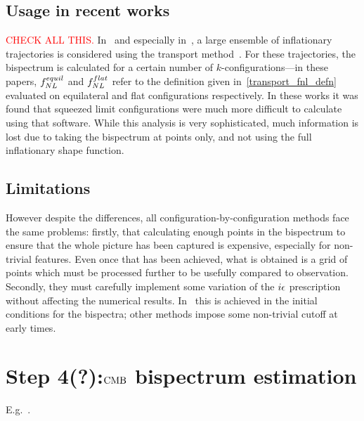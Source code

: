     \subsection{Usage in recent works}
    \textcolor{red}{CHECK ALL THIS.}
    In~\cite{RP_1, Fumagalli_2019} and especially
    in~\cite{Marzouk_D3}, a large ensemble of inflationary trajectories is considered
    using the transport method~\cite{transport_pytransport_2}.
    For these trajectories, the bispectrum is calculated for a certain number of $k$-configurations---in
    these papers, $f^{equil}_{NL}$ and $f_{NL}^{flat}$ refer to the definition given in~\eqref{transport_fnl_defn}
    evaluated on equilateral and flat configurations respectively.
    In these works it was found that squeezed limit configurations were much more
    difficult to calculate using that software. While this analysis is very sophisticated, much
    information is lost due to taking the bispectrum at points only, and not using the full
    inflationary shape function.
    \subsection{Limitations}
    However despite the differences, all configuration-by-configuration methods face the same problems:
firstly, that calculating enough points in the bispectrum to ensure that
the whole picture has been captured is expensive, especially for non-trivial features.
Even once that has been achieved, what is obtained is a grid of points
which must be processed further to be usefully compared to observation.
Secondly, they must carefully implement some variation
of the $i\epsilon$ prescription without affecting the numerical results.
In~\cite{transport_main} this is achieved in the initial conditions for the bispectra;
other methods impose some non-trivial cutoff at early times.


    \section{Step 4(?):$\text{CMB}$ bispectrum estimation}
    E.g.~\cite{Smith_2011, Komatsu_2005, Byun_1, Byun_2, modal_battefeld}.


